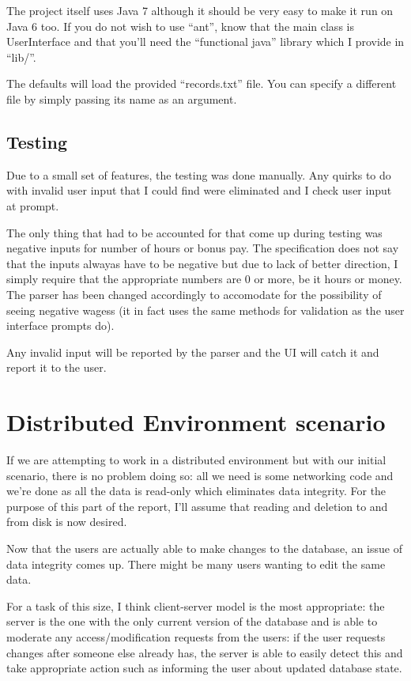 \documentclass{report}
\begin{document}
The project itself uses Java 7 although it should be very easy to make
it run on Java 6 too. If you do not wish to use ``ant'', know that the
main class is UserInterface and that you'll need the ``functional
java'' library which I provide in ``lib/''.

The defaults will load the provided ``records.txt'' file. You can
specify a different file by simply passing its name as an argument.

\subsection*{Testing}
Due to a small set of features, the testing was done manually. Any
quirks to do with invalid user input that I could find were eliminated
and I check user input at prompt.

The only thing that had to be accounted for that come up during
testing was negative inputs for number of hours or bonus pay. The
specification does not say that the inputs alwayas have to be negative
but due to lack of better direction, I simply require that the
appropriate numbers are 0 or more, be it hours or money. The parser
has been changed accordingly to accomodate for the possibility of
seeing negative wagess (it in fact uses the same methods for
validation as the user interface prompts do).

Any invalid input will be reported by the parser and the UI will catch
it and report it to the user.


\section*{Distributed Environment scenario}
If we are attempting to work in a distributed environment but with our
initial scenario, there is no problem doing so: all we need is some
networking code and we're done as all the data is read-only which
eliminates data integrity. For the purpose of this part of the report,
I'll assume that reading and deletion to and from disk is now desired.

Now that the users are actually able to make changes to the database,
an issue of data integrity comes up. There might be many users wanting
to edit the same data.

For a task of this size, I think client-server model is the most
appropriate: the server is the one with the only current version of
the database and is able to moderate any access/modification requests
from the users: if the user requests changes after someone else
already has, the server is able to easily detect this and take
appropriate action such as informing the user about updated database
state.
\end{document}
